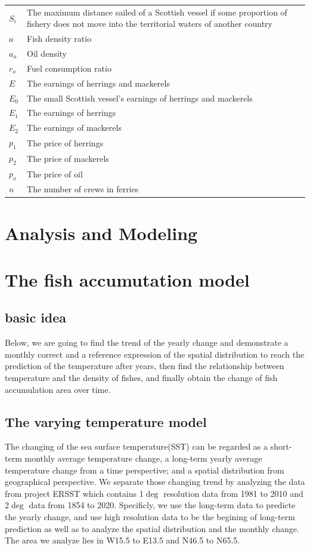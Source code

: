 \documentclass{mcmthesis}
\begin{document}
\begin{center}
\begin{longtable}{p{}p{}m{}}
$S_i$      & The maximum distance sailed of a Scottish vessel   if  some proportion of fishery does not move  into the territorial waters of another country \\
$a$      & Fish density ratio \\
$a_o$      & Oil density \\
$r_o$      & Fuel consumption ratio \\
$E$      & The earnings  of herrings and mackerels \\
$E_0$      & The small Scottish vessel's earnings  of herrings and mackerels \\
$E_1$      & The earnings  of herrings\\
$E_2$      & The earnings  of mackerels\\
$p_1$      & The price  of herrings \\
$p_2$      & The price  of mackerels  \\
$p_o$      & The price  of oil  \\
$n$      & The number  of  crews in ferries \\



 \end{longtable}
 \end{center}
 
\section{Analysis and Modeling}
 \section{The fish accumutation model}
 \subsection{basic idea}
    Below, we are going to find the trend of the yearly change and demonstrate a monthly correct and a reference expression of the spatial distribution to reach the prediction of the temperature after years, then find the relationship between temperature and the density of fishes, and finally obtain the change of fish accumulation area over time. 
 \subsection{The varying temperature model}
 
  
    The changing of the sea surface temperature(SST) can be regarded as a short-term monthly average temperature change, a long-term yearly average temperature change from a time perspective; and a spatial distribution from geographical perspective. 
    We separate those changing trend by analyzing the data from project ERSST which contains 1$\deg$ resolution data from 1981 to 2010 and 2$\deg$ data from 1854 to 2020. Specificly, we use the long-term data to predicte the yearly change, and use high resolution data to be the begining of long-term prediction as well as to analyze the spatial distribution and the monthly change. The area we analyze lies in W15.5 to E13.5 and N46.5 to N65.5.
    
\end{document}
